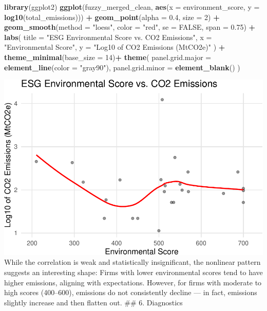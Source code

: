 \documentclass[
]{article}
\newenvironment{Shaded}{\begin{snugshade}}{\end{snugshade}}
\newcommand{\AttributeTok}[1]{\textcolor[rgb]{0.13,0.29,0.53}{#1}}
\newcommand{\ConstantTok}[1]{\textcolor[rgb]{0.56,0.35,0.01}{#1}}
\newcommand{\DecValTok}[1]{\textcolor[rgb]{0.00,0.00,0.81}{#1}}
\newcommand{\FloatTok}[1]{\textcolor[rgb]{0.00,0.00,0.81}{#1}}
\newcommand{\FunctionTok}[1]{\textcolor[rgb]{0.13,0.29,0.53}{\textbf{#1}}}
\newcommand{\NormalTok}[1]{#1}
\newcommand{\SpecialCharTok}[1]{\textcolor[rgb]{0.81,0.36,0.00}{\textbf{#1}}}
\newcommand{\StringTok}[1]{\textcolor[rgb]{0.31,0.60,0.02}{#1}}
\begin{document}
\begin{Shaded}
\begin{Highlighting}[]
\FunctionTok{library}\NormalTok{(ggplot2)}
\FunctionTok{ggplot}\NormalTok{(fuzzy\_merged\_clean, }\FunctionTok{aes}\NormalTok{(}\AttributeTok{x =}\NormalTok{ environment\_score, }\AttributeTok{y =} \FunctionTok{log10}\NormalTok{(total\_emissions))) }\SpecialCharTok{+}
  \FunctionTok{geom\_point}\NormalTok{(}\AttributeTok{alpha =} \FloatTok{0.4}\NormalTok{, }\AttributeTok{size =} \DecValTok{2}\NormalTok{) }\SpecialCharTok{+}
  \FunctionTok{geom\_smooth}\NormalTok{(}\AttributeTok{method =} \StringTok{"loess"}\NormalTok{, }\AttributeTok{color =} \StringTok{"red"}\NormalTok{, }\AttributeTok{se =} \ConstantTok{FALSE}\NormalTok{, }\AttributeTok{span =} \FloatTok{0.75}\NormalTok{) }\SpecialCharTok{+}
  \FunctionTok{labs}\NormalTok{(}
    \AttributeTok{title =} \StringTok{"ESG Environmental Score vs. CO2 Emissions"}\NormalTok{,}
    \AttributeTok{x =} \StringTok{"Environmental Score"}\NormalTok{,}
    \AttributeTok{y =} \StringTok{"Log10 of CO2 Emissions (MtCO2e)"}
\NormalTok{  ) }\SpecialCharTok{+}
  \FunctionTok{theme\_minimal}\NormalTok{(}\AttributeTok{base\_size =} \DecValTok{14}\NormalTok{)}\SpecialCharTok{+}
  \FunctionTok{theme}\NormalTok{(}
    \AttributeTok{panel.grid.major =} \FunctionTok{element\_line}\NormalTok{(}\AttributeTok{color =} \StringTok{"gray90"}\NormalTok{),}
    \AttributeTok{panel.grid.minor =} \FunctionTok{element\_blank}\NormalTok{()}
\NormalTok{  )}
\end{Highlighting}
\end{Shaded}

\includegraphics{ESG-code_files/figure-latex/loess-plot-1.pdf} While the
correlation is weak and statistically insignificant, the nonlinear
pattern suggests an interesting shape: Firms with lower environmental
scores tend to have higher emissions, aligning with expectations.
However, for firms with moderate to high scores (400--600), emissions do
not consistently decline --- in fact, emissions slightly increase and
then flatten out. \#\# 6. Diagnostics
\end{document}

